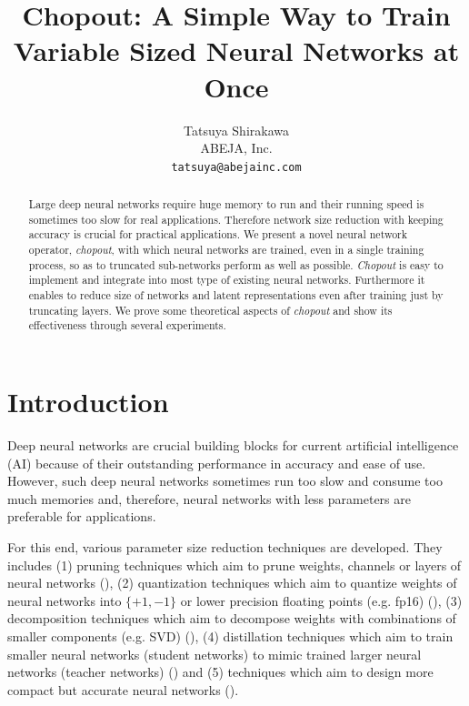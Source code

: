 \documentclass{article}
\title{Chopout: A Simple Way to Train Variable Sized Neural Networks at Once}
\author{
      Tatsuya Shirakawa \\
      ABEJA, Inc. \\
      \texttt{tatsuya@abejainc.com}
    }
\begin{document}
    
    \maketitle
    
    \begin{abstract}
      Large deep neural networks require huge memory to run and their running speed is sometimes too slow for real applications. Therefore network size reduction with keeping accuracy is crucial for practical applications. We present a novel neural network operator, \textit{chopout}, with which neural networks are trained, even in a single training process, so as to truncated sub-networks perform as well as possible. \textit{Chopout} is easy to implement and integrate into most type of existing neural networks. Furthermore it enables to reduce size of networks and latent representations even after training just by truncating layers. We prove some theoretical aspects of \textit{chopout} and show its effectiveness through several experiments.
    \end{abstract}
    
    \section{Introduction}
    
    Deep neural networks are crucial building blocks for current artificial intelligence (AI)  because of their outstanding performance in accuracy and ease of use. However, such deep neural networks sometimes run too slow and consume too much memories and, therefore, neural networks with less parameters are preferable for applications.
    
    For this end, various parameter size reduction techniques are developed. They includes 
    (1) pruning techniques which aim to prune weights, channels or layers of neural networks (\citet{han2015deep, aghasi2017nettrim, dong2017learning, molchanov2016pruning, li2017pruning, luo2017thinet, ye2018rethinking, liu2017learning, he2017channel}), 
    (2) quantization techniques which aim to quantize weights of neural networks into $\{+1, -1\}$ or lower precision floating points (e.g. fp16) (\citet{han2015learning, courbariaux2015binaryconnect, rastegari2016xnor, zhou2016dorefa, zhu2016trained,  wu2016quantized, hubara2017quantized}), 
    (3) decomposition techniques which aim to decompose weights with combinations of smaller components (e.g. SVD) (\citet{denton2014exploiting, jaderberg2014speeding, lebedev2014speeding, yang2015deep, novikov2015tensorizing}), 
    (4) distillation techniques which aim to train smaller neural networks (student networks) to mimic trained larger neural networks (teacher networks) (\citet{hinton2015distilling, mishra2017apprentice, polino2018model}) and 
    (5) techniques which aim to design more compact but accurate neural networks (\citet{iandola2016squeezenet, howard2017mobilenet, sandler2018mobilenetv2, zhang2017shufflenet}).
\end{document}
